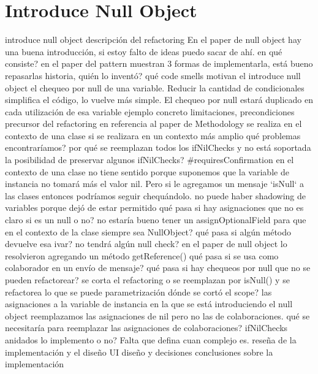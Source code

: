 \section{Introduce Null Object}

introduce null object
    descripción del refactoring
    En el paper de null object hay una buena introducción, si estoy falto de ideas puedo sacar de ahí.
        en qué consiste?
        en el paper del pattern muestran 3 formas de implementarla, está bueno repasarlas
        historia, quién lo inventó?
        qué code smells motivan el introduce null object
        el chequeo por null de una variable. Reducir la cantidad de condicionales simplifica el código, lo vuelve más simple. El chequeo por null estará duplicado en cada utilización de esa variable
    ejemplo concreto
    limitaciones, precondiciones
        precursor del refactoring en referencia al paper de Methodology
        se realiza en el contexto de una clase
        si se realizara en un contexto más amplio qué problemas encontraríamos?
        por qué se reemplazan todos los ifNilChecks y no está soportada la posibilidad de preservar algunos ifNilChecks? \#requiresConfirmation 
        en el contexto de una clase no tiene sentido porque suponemos que la variable de instancia no tomará más el valor nil. Pero si le agregamos un mensaje `isNull` a las clases entonces podríamos seguir chequándolo.
        no puede haber shadowing de variables porque dejó de estar permitido
        qué pasa si hay asignaciones que no es claro si es un null o no? no estaría bueno tener un assignOptionalField para que en el contexto de la clase siempre sea NullObject?
        qué pasa si algún método devuelve esa ivar? no tendrá algún null check?
        en el paper de null object lo resolvieron agregando un método getReference()
        qué pasa si se usa como colaborador en un envío de mensaje?
        qué pasa si hay chequeos por null que no se pueden refactorear?
        se corta el refactoring o se reemplazan por isNull() y se refactorea lo que se puede
    parametrización
    dónde se cortó el scope?
        las asignaciones a la variable de instancia en la que se está introduciendo el null object
        reemplazamos las asignaciones de nil pero no las de colaboraciones.
            qué se necesitaría para reemplazar las asignaciones de colaboraciones?
        ifNilChecks anidados
        lo implemento o no? Falta que defina cuan complejo es.
    reseña de la implementación y el diseño
    UI diseño y decisiones
    conclusiones sobre la implementación


